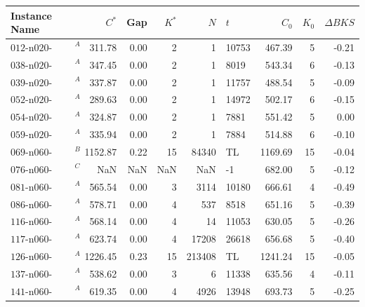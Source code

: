 \begin{table}
    \small
    \centering
    \begin{tabular}{lrrrrlrrr}
        \toprule
        Instance Name                  & $C^*$   & Gap  & $K^*$ & $N$    & $t$   & $C_0$   & $K_0$ & $\Delta BKS$ \\
        \midrule
        $\text{012-n020-m200-bt100}^A$ & 311.78  & 0.00 & 2     & 1      & 10753 & 467.39  & 5     & -0.21        \\
        $\text{038-n020-m200-bt10}^A$  & 347.45  & 0.00 & 2     & 1      & 8019  & 543.34  & 6     & -0.13        \\
        $\text{039-n020-m200-bt10}^A$  & 337.87  & 0.00 & 2     & 1      & 11757 & 488.54  & 5     & -0.09        \\
        $\text{052-n020-m200-bt10}^A$  & 289.63  & 0.00 & 2     & 1      & 14972 & 502.17  & 6     & -0.15        \\
        $\text{054-n020-m200-bt10}^A$  & 324.87  & 0.00 & 2     & 1      & 7881  & 551.42  & 5     & 0.00         \\
        $\text{059-n020-m200-bt100}^A$ & 335.94  & 0.00 & 2     & 1      & 7884  & 514.88  & 6     & -0.10        \\
        $\text{069-n060-m200-bt10}^B$  & 1152.87 & 0.22 & 15    & 84340  & TL    & 1169.69 & 15    & -0.04        \\
        $\text{076-n060-m200-bt3}^C$   & NaN     & NaN  & NaN   & NaN    & -1    & 682.00  & 5     & -0.12        \\
        $\text{081-n060-m200-bt10}^A$  & 565.54  & 0.00 & 3     & 3114   & 10180 & 666.61  & 4     & -0.49        \\
        $\text{086-n060-m200-bt100}^A$ & 578.71  & 0.00 & 4     & 537    & 8518  & 651.16  & 5     & -0.39        \\
        $\text{116-n060-m200-bt100}^A$ & 568.14  & 0.00 & 4     & 14     & 11053 & 630.05  & 5     & -0.26        \\
        $\text{117-n060-m200-bt100}^A$ & 623.74  & 0.00 & 4     & 17208  & 26618 & 656.68  & 5     & -0.40        \\
        $\text{126-n060-m200-bt10}^A$  & 1226.45 & 0.23 & 15    & 213408 & TL    & 1241.24 & 15    & -0.05        \\
        $\text{137-n060-m200-bt3}^A$   & 538.62  & 0.00 & 3     & 6      & 11338 & 635.56  & 4     & -0.11        \\
        $\text{141-n060-m200-bt10}^A$  & 619.35  & 0.00 & 4     & 4926   & 13948 & 693.73  & 5     & -0.25        \\

\end{tabular}
\end{table}
